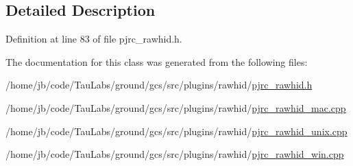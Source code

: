 \subsection{\-Detailed \-Description}


\-Definition at line 83 of file pjrc\-\_\-rawhid.\-h.



\-The documentation for this class was generated from the following files\-:\begin{DoxyCompactItemize}
\item 
/home/jb/code/\-Tau\-Labs/ground/gcs/src/plugins/rawhid/\hyperlink{pjrc__rawhid_8h}{pjrc\-\_\-rawhid.\-h}\item 
/home/jb/code/\-Tau\-Labs/ground/gcs/src/plugins/rawhid/\hyperlink{pjrc__rawhid__mac_8cpp}{pjrc\-\_\-rawhid\-\_\-mac.\-cpp}\item 
/home/jb/code/\-Tau\-Labs/ground/gcs/src/plugins/rawhid/\hyperlink{pjrc__rawhid__unix_8cpp}{pjrc\-\_\-rawhid\-\_\-unix.\-cpp}\item 
/home/jb/code/\-Tau\-Labs/ground/gcs/src/plugins/rawhid/\hyperlink{pjrc__rawhid__win_8cpp}{pjrc\-\_\-rawhid\-\_\-win.\-cpp}\end{DoxyCompactItemize}
